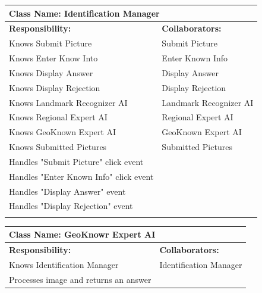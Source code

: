 \documentclass[]{article}
\begin{document}
\begin{itemize}
	\begin{table}
		\centering
		\begin{tabular}{|p{8cm}|p{8cm}|}
		\hline 
		 \multicolumn{2}{|l|}{\textbf{Class Name:} Identification Manager} \\
		\hline
		\textbf{Responsibility:} & \textbf{Collaborators:} \\
		\hline
            Knows Submit Picture & Submit Picture \\
            Knows Enter Know Into & Enter Known Info \\
            Knows Display Answer & Display Answer \\
            Knows Display Rejection & Display Rejection \\
            Knows Landmark Recognizer AI & Landmark Recognizer AI \\
            Knows Regional Expert AI & Regional Expert AI \\
            Knows GeoKnown Expert AI & GeoKnown Expert AI \\
            Knows Submitted Pictures & Submitted Pictures \\
            Handles "Submit Picture" click event & \\
            Handles "Enter Known Info" click event & \\
            Handles "Display Answer" event & \\
            Handles "Display Rejection" event & \\
		\vspace{1cm} & \\
		\hline
		\end{tabular}
	\end{table}

	\begin{table}
		\centering
		\begin{tabular}{|p{8cm}|p{8cm}|}
		\hline 
		 \multicolumn{2}{|l|}{\textbf{Class Name:} GeoKnowr Expert AI} \\
		\hline
		\textbf{Responsibility:} & \textbf{Collaborators:} \\
		\hline
            Knows Identification Manager & Identification Manager \\
            Processes image and returns an answer
		\vspace{1cm} & \\
		\hline
		\end{tabular}
	\end{table}


\end{itemize}
\end{document}
